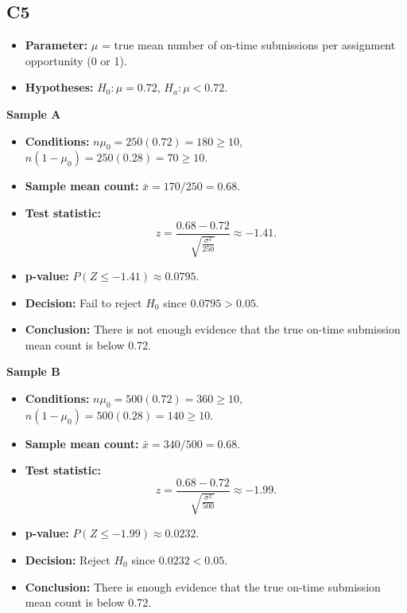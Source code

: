 \subsection*{C5}
\begin{itemize}
	\item \textbf{Parameter:} \(\mu\) = true mean number of on-time submissions per assignment opportunity (0 or 1).
	\item \textbf{Hypotheses:} \(H_0\colon \mu=0.72\), \(H_a\colon \mu<0.72\).
\end{itemize}

\textbf{Sample A}

\begin{itemize}
	\item \textbf{Conditions:} \(n\mu_0=250(0.72)=180\ge10\), \(n(1-\mu_0)=250(0.28)=70\ge10\).
	\item \textbf{Sample mean count:} \(\bar x=170/250=0.68\).
	\item \textbf{Test statistic:}
	\[
	z=\frac{0.68-0.72}{\sqrt{\frac{\sigma^2}{250}}}\approx -1.41.
	\]
	\item \textbf{p-value:} \(P(Z\le -1.41)\approx 0.0795\).
	\item \textbf{Decision:} Fail to reject \(H_0\) since \(0.0795>0.05\).
	\item \textbf{Conclusion:} There is not enough evidence that the true on-time submission mean count is below 0.72.
\end{itemize}

\begin{center}
\end{center}


\textbf{Sample B}

\begin{itemize}
	\item \textbf{Conditions:} \(n\mu_0=500(0.72)=360\ge10\), \(n(1-\mu_0)=500(0.28)=140\ge10\).
	\item \textbf{Sample mean count:} \(\bar x=340/500=0.68\).
	\item \textbf{Test statistic:}
	\[
	z=\frac{0.68-0.72}{\sqrt{\frac{\sigma^2}{500}}}\approx -1.99.
	\]
	\item \textbf{p-value:} \(P(Z\le -1.99)\approx 0.0232\).
	\item \textbf{Decision:} Reject \(H_0\) since \(0.0232<0.05\).
	\item \textbf{Conclusion:} There is enough evidence that the true on-time submission mean count is below 0.72.
\end{itemize}

